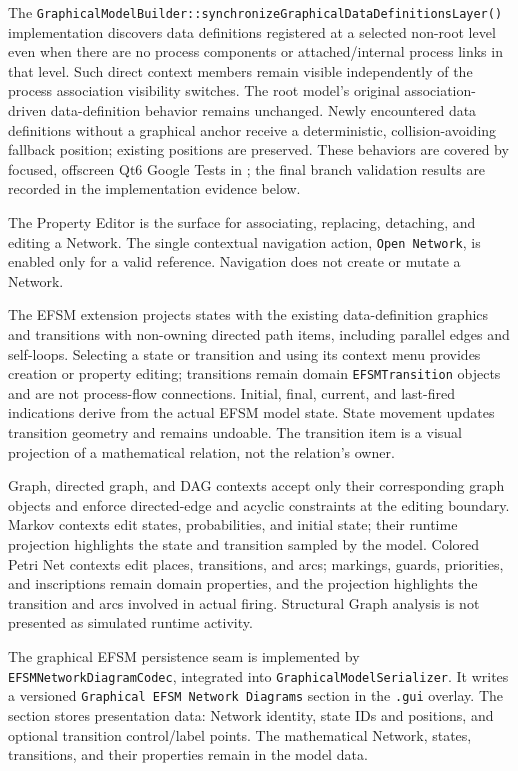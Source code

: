 The \texttt{GraphicalModelBuilder::synchronizeGraphicalDataDefinitionsLayer()}
implementation discovers data definitions registered
at a selected non-root level even when there are no process components
or attached/internal process links in that level. Such direct context members
remain visible independently of the process association visibility switches.
The root model's original association-driven data-definition behavior remains
unchanged. Newly encountered data definitions without a graphical anchor receive
a deterministic, collision-avoiding fallback position; existing positions are
preserved. These behaviors are covered by focused, offscreen Qt6 Google Tests
in ; the final branch
validation results are recorded in the implementation evidence below.

The Property Editor is the surface for associating, replacing, detaching, and
editing a Network. The
single contextual navigation action, \texttt{Open Network}, is enabled only
for a valid reference. Navigation does not create or mutate a Network.

The EFSM extension projects states with the existing data-definition graphics
and transitions with non-owning directed path items, including parallel edges
and self-loops. Selecting a state or transition and using its context menu
provides creation or property editing; transitions remain domain
\texttt{EFSMTransition} objects and are not process-flow connections. Initial,
final, current, and last-fired indications derive from the actual EFSM model
state. State movement updates transition geometry and remains undoable. The
transition item is a visual projection of a mathematical relation, not the
relation's owner.

Graph, directed graph, and DAG contexts accept only their corresponding graph
objects and enforce directed-edge and acyclic constraints at the editing
boundary. Markov contexts edit states, probabilities, and initial state; their
runtime projection highlights the state and transition sampled by the model.
Colored Petri Net contexts edit places, transitions, and arcs; markings,
guards, priorities, and inscriptions remain domain properties, and the
projection highlights the transition and arcs involved in actual firing.
Structural Graph analysis is not presented as simulated runtime activity.

The graphical EFSM persistence seam is implemented by
\texttt{EFSMNetworkDiagramCodec}, integrated into
\texttt{GraphicalModelSerializer}. It writes a versioned
\texttt{Graphical EFSM Network Diagrams} section in the \texttt{.gui} overlay.
The section stores presentation data: Network identity, state IDs and
positions, and optional transition control/label points. The mathematical
Network, states, transitions, and their properties remain in the model data.

